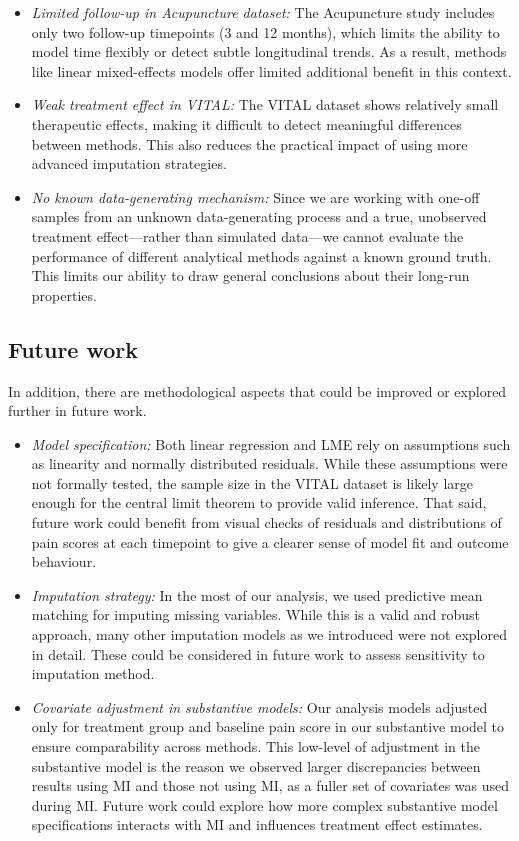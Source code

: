 \documentclass{article}
\begin{document}
\begin{itemize}
\item
  \emph{Limited follow-up in Acupuncture dataset:} The Acupuncture study
  includes only two follow-up timepoints (3 and 12 months), which limits
  the ability to model time flexibly or detect subtle longitudinal
  trends. As a result, methods like linear mixed-effects models offer
  limited additional benefit in this context.
\item
  \emph{Weak treatment effect in VITAL:} The VITAL dataset shows
  relatively small therapeutic effects, making it difficult to detect
  meaningful differences between methods. This also reduces the
  practical impact of using more advanced imputation strategies.
\item
  \emph{No known data-generating mechanism:} Since we are working with
  one-off samples from an unknown data-generating process and a true,
  unobserved treatment effect---rather than simulated data---we cannot
  evaluate the performance of different analytical methods against a
  known ground truth. This limits our ability to draw general
  conclusions about their long-run properties.
\end{itemize}

\subsection{Future work}\label{future-work}

In addition, there are methodological aspects that could be improved or
explored further in future work.

\begin{itemize}
\item
  \emph{Model specification:} Both linear regression and LME rely on
  assumptions such as linearity and normally distributed residuals.
  While these assumptions were not formally tested, the sample size in
  the VITAL dataset is likely large enough for the central limit theorem
  to provide valid inference. That said, future work could benefit from
  visual checks of residuals and distributions of pain scores at each
  timepoint to give a clearer sense of model fit and outcome behaviour.
\item
  \emph{Imputation strategy:} In the most of our analysis, we used
  predictive mean matching for imputing missing variables. While this is
  a valid and robust approach, many other imputation models as we
  introduced were not explored in detail. These could be considered in
  future work to assess sensitivity to imputation method.
\item
  \emph{Covariate adjustment in substantive models:} Our analysis models
  adjusted only for treatment group and baseline pain score in our
  substantive model to ensure comparability across methods. This
  low-level of adjustment in the substantive model is the reason we
  observed larger discrepancies between results using MI and those not
  using MI, as a fuller set of covariates was used during MI. Future
  work could explore how more complex substantive model specifications
  interacts with MI and influences treatment effect estimates.
\end{itemize}
\end{document}
